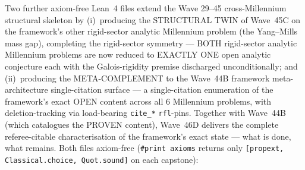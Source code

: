 Two further axiom-free Lean~4 files extend the Wave 29--45
cross-Millennium structural skeleton by (i)~producing the
STRUCTURAL TWIN of Wave~45C on the framework's other rigid-sector
analytic Millennium problem (the Yang--Mills mass gap), completing
the rigid-sector symmetry --- BOTH rigid-sector analytic Millennium
problems are now reduced to EXACTLY ONE open analytic conjecture
each with the Galois-rigidity premise discharged unconditionally;
and (ii)~producing the META-COMPLEMENT to the Wave~44B framework
meta-architecture single-citation surface --- a single-citation
enumeration of the framework's exact OPEN content across all 6
Millennium problems, with deletion-tracking via load-bearing
\texttt{cite\_*} \texttt{rfl}-pins. Together with Wave~44B
(which catalogues the PROVEN content), Wave~46D delivers the
complete referee-citable characterisation of the framework's
exact state --- what is done, what remains. Both files axiom-free
(\texttt{\#print axioms} returns only
\texttt{[propext, Classical.choice, Quot.sound]} on each capstone):

